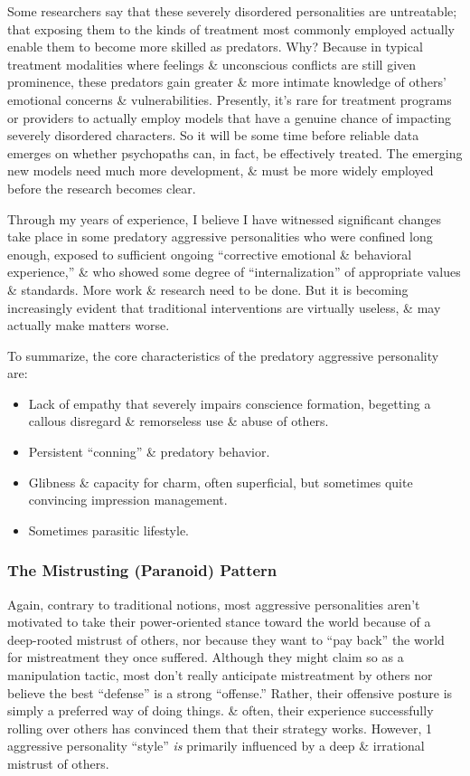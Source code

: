 \documentclass{article}
\numberwithin{equation}{section}
\begin{document}
Some researchers say that these severely disordered personalities are untreatable; that exposing them to the kinds of treatment most commonly employed actually enable them to become more skilled as predators. Why? Because in typical treatment modalities where feelings \& unconscious conflicts are still given prominence, these predators gain greater \& more intimate knowledge of others' emotional concerns \& vulnerabilities. Presently, it's rare for treatment programs or providers to actually employ models that have a genuine chance of impacting severely disordered characters. So it will be some time before reliable data emerges on whether psychopaths can, in fact, be effectively treated. The emerging new models need much more development, \& must be more widely employed before the research becomes clear.

Through my years of experience, I believe I have witnessed significant changes take place in some predatory aggressive personalities who were confined long enough, exposed to sufficient ongoing ``corrective emotional \& behavioral experience,'' \& who showed some degree of ``internalization'' of appropriate values \& standards. More work \& research need to be done. But it is becoming increasingly evident that traditional interventions are virtually useless, \& may actually make matters worse.

To summarize, the core characteristics of the predatory aggressive personality are:
\begin{itemize}
	\item Lack of empathy that severely impairs conscience formation, begetting a callous disregard \& remorseless use \& abuse of others.
	\item Persistent ``conning'' \& predatory behavior.
	\item Glibness \& capacity for charm, often superficial, but sometimes quite convincing impression management.
	\item Sometimes parasitic lifestyle.
\end{itemize}

\subsubsection{The Mistrusting (Paranoid) Pattern}
Again, contrary to traditional notions, most aggressive personalities aren't motivated to take their power-oriented stance toward the world because of a deep-rooted mistrust of others, nor because they want to ``pay back'' the world for mistreatment they once suffered. Although they might claim so as a manipulation tactic, most don't really anticipate mistreatment by others nor believe the best ``defense'' is a strong ``offense.'' Rather, their offensive posture is simply a preferred way of doing things. \& often, their experience successfully rolling over others has convinced them that their strategy works. However, 1 aggressive personality ``style'' \textit{is} primarily influenced by a deep \& irrational mistrust of others.
\end{document}
